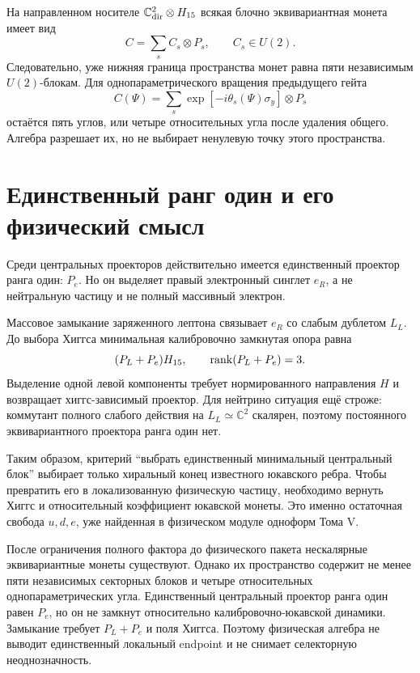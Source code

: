 На направленном носителе $\mathbb C^2_{\rm dir}\otimes H_{15}$ всякая
блочно эквивариантная монета имеет вид
\begin{equation}
 C=\sum_s C_s\otimes P_s,
 \qquad C_s\in U(2).
 \label{eq:v6-discrete-sector-coin}
\end{equation}
Следовательно, уже нижняя граница пространства монет равна пяти независимым
$U(2)$-блокам. Для однопараметрического вращения предыдущего гейта
\begin{equation}
 C(\Psi)=\sum_s
 \exp\!\left[-i\theta_s(\Psi)\sigma_y\right]\otimes P_s
 \label{eq:v6-discrete-five-angle-coin}
\end{equation}
остаётся пять углов, или четыре относительных угла после удаления общего.
Алгебра разрешает их, но не выбирает ненулевую точку этого пространства.

\section{Единственный ранг один и его физический смысл}

Среди центральных проекторов действительно имеется единственный проектор
ранга один: $P_e$. Но он выделяет правый электронный синглет $e_R$, а не
нейтральную частицу и не полный массивный электрон.

Массовое замыкание заряженного лептона связывает $e_R$ со слабым дублетом
$L_L$. До выбора Хиггса минимальная калибровочно замкнутая опора равна
\begin{equation}
 (P_L+P_e)H_{15},\qquad \operatorname{rank}(P_L+P_e)=3.
 \label{eq:v6-discrete-lepton-closed-rank}
\end{equation}
Выделение одной левой компоненты требует нормированного направления $H$ и
возвращает хиггс-зависимый проектор. Для нейтрино ситуация ещё строже:
коммутант полного слабого действия на $L_L\simeq\mathbb C^2$ скалярен,
поэтому постоянного эквивариантного проектора ранга один нет.

Таким образом, критерий ``выбрать единственный минимальный центральный
блок'' выбирает только хиральный конец известного юкавского ребра. Чтобы
превратить его в локализованную физическую частицу, необходимо вернуть
Хиггс и относительный коэффициент юкавской монеты. Это именно остаточная
свобода $u,d,e$, уже найденная в физическом модуле одноформ Тома V.

\begin{theorem}
После ограничения полного фактора до физического пакета нескалярные
эквивариантные монеты существуют. Однако их пространство содержит не менее
пяти независимых секторных блоков и четыре относительных однопараметрических
угла. Единственный центральный проектор ранга один равен $P_e$, но он не
замкнут относительно калибровочно-юкавской динамики. Замыкание требует
$P_L+P_e$ и поля Хиггса. Поэтому физическая алгебра не выводит единственный
локальный endpoint и не снимает селекторную неоднозначность.
\end{theorem}

